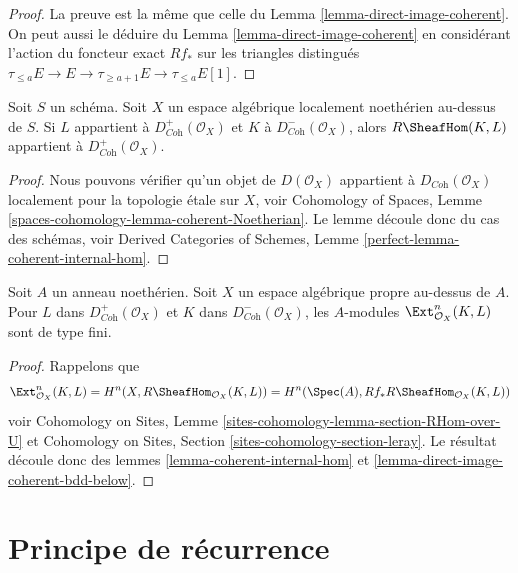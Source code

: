 \begin{proof}
La preuve est la même que celle du
Lemma \ref{lemma-direct-image-coherent}.
On peut aussi le déduire du
Lemma \ref{lemma-direct-image-coherent}
en considérant l'action du foncteur exact $Rf_*$ sur les
triangles distingués
$\tau_{\leq a}E \to E \to \tau_{\geq a + 1}E \to \tau_{\leq a}E[1]$.
\end{proof}

\begin{lemma}
\label{lemma-coherent-internal-hom}
Soit $S$ un schéma. Soit $X$ un espace algébrique localement noethérien au-dessus de $S$.
Si $L$ appartient à $D^+_{\textit{Coh}}(\mathcal{O}_X)$
et $K$ à $D^-_{\textit{Coh}}(\mathcal{O}_X)$, alors
$R\SheafHom(K, L)$ appartient à $D^+_{\textit{Coh}}(\mathcal{O}_X)$.
\end{lemma}

\begin{proof}
Nous pouvons vérifier qu'un objet de $D(\mathcal{O}_X)$ appartient à
$D_{\textit{Coh}}(\mathcal{O}_X)$ localement pour la topologie étale sur $X$, voir
Cohomology of Spaces, Lemme \ref{spaces-cohomology-lemma-coherent-Noetherian}.
Le lemme découle donc du cas des schémas, voir
Derived Categories of Schemes, Lemme \ref{perfect-lemma-coherent-internal-hom}.
\end{proof}

\begin{lemma}
\label{lemma-ext-finite}
Soit $A$ un anneau noethérien. Soit $X$ un espace algébrique propre au-dessus de $A$.
Pour $L$ dans $D^+_{\textit{Coh}}(\mathcal{O}_X)$ et $K$ dans
$D^-_{\textit{Coh}}(\mathcal{O}_X)$, les $A$-modules
$\Ext_{\mathcal{O}_X}^n(K, L)$ sont de type fini.
\end{lemma}

\begin{proof}
Rappelons que
$$
\Ext_{\mathcal{O}_X}^n(K, L) =
H^n(X, R\SheafHom_{\mathcal{O}_X}(K, L)) =
H^n(\Spec(A), Rf_*R\SheafHom_{\mathcal{O}_X}(K, L))
$$
voir Cohomology on Sites, Lemme \ref{sites-cohomology-lemma-section-RHom-over-U}
et Cohomology on Sites, Section \ref{sites-cohomology-section-leray}.
Le résultat découle donc des lemmes \ref{lemma-coherent-internal-hom} et
\ref{lemma-direct-image-coherent-bdd-below}.
\end{proof}




\section{Principe de récurrence}
\label{section-induction}

